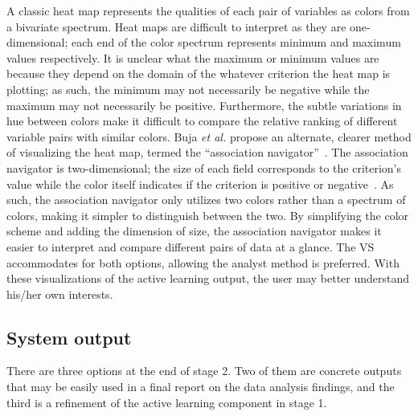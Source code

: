 \noindent A classic heat map represents the qualities of each pair of variables 
as colors from a bivariate spectrum. 
Heat maps are difficult to interpret as they are 
one-dimensional; each end of the color spectrum represents minimum and maximum 
values respectively. It is unclear what the maximum or minimum values are 
because they depend on the domain of the whatever criterion the heat map is 
plotting; as such, the minimum may not necessarily be negative while the 
maximum may not necessarily be positive. Furthermore, the subtle variations in 
hue between colors make it difficult to compare the relative ranking of 
different variable pairs with similar colors. Buja \textit{et al.} 
propose an alternate, clearer method of visualizing the heat map, termed the 
``association navigator''~\cite{buja2016}. The association navigator is 
two-dimensional; the size of each field corresponds to the criterion's value 
while the color itself indicates if the criterion is positive or 
negative~\cite{buja2016}. As such, the 
association navigator only utilizes two colors rather than a spectrum of 
colors, making it simpler to distinguish between the two. By simplifying the 
color scheme and adding the dimension of size, the association navigator makes 
it easier to interpret and compare different pairs of data at a glance. 
The VS accommodates for both options, 
allowing the analyst method is preferred. 
With these visualizations of the active learning output, the user may better 
understand his/her own interests. 

\subsection{System output}
\label{sec:visualizer:plotgeneration:output}

There are three options at the end of stage 2. Two of them are concrete outputs 
that may be easily used in a final report on the data analysis findings, and 
the third is a refinement of the active learning component in stage 1.

